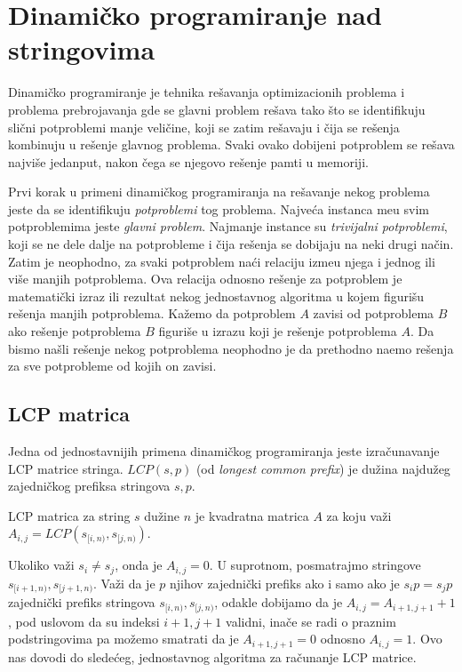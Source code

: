\section{Dinami\v cko programiranje nad stringovima}

Dinami\v cko programiranje je tehnika re\v savanja optimizacionih problema i problema prebrojavanja gde se glavni problem re\v sava tako \v sto se identifikuju sli\v cni potproblemi manje veli\v cine, koji se zatim re\v savaju i \v cija se re\v senja kombinuju u re\v senje glavnog problema. Svaki ovako dobijeni potproblem se re\v sava najvi\v se jedanput, nakon \v cega se njegovo re\v senje pamti u memoriji.

Prvi korak u primeni dinami\v ckog programiranja na re\v savanje nekog problema jeste da se identifikuju \textit{potproblemi} tog problema. Najve\' ca instanca me\dj u svim potproblemima jeste \textit{glavni problem}. Najmanje instance su \textit{trivijalni potproblemi}, koji se ne dele dalje na potprobleme i \v cija re\v senja se dobijaju na neki drugi na\v cin. Zatim je neophodno, za svaki potproblem na\' ci relaciju izme\dj u njega i jednog ili vi\v se manjih potproblema. Ova relacija odnosno re\v senje za potproblem je matemati\v cki izraz ili rezultat nekog jednostavnog algoritma u kojem figuri\v su re\v senja manjih potproblema. Ka\v zemo da potproblem $A$ zavisi od potproblema $B$ ako re\v senje potproblema $B$ figuri\v se u izrazu koji je re\v senje potproblema $A$. Da bismo na\v sli re\v senje nekog potproblema neophodno je da prethodno na\dj emo re\v senja za sve potprobleme od kojih on zavisi.

\subsection{LCP matrica}

Jedna od jednostavnijih primena dinami\v ckog programiranja jeste izra\v cunavanje LCP matrice stringa. $LCP(s, p)$ (od \textit{longest common prefix}) je du\v zina najdu\v zeg zajedni\v ckog prefiksa stringova $s,p$.

\begin{dfn}
LCP matrica za string $s$ du\v zine $n$ je kvadratna matrica $A$ za koju va\v zi $A_{i,j} = LCP(s_{[i,n)}, s_{[j, n)})$.
\end{dfn}

Ukoliko va\v zi $s_i \not = s_j$, onda je $A_{i,j} = 0$. U suprotnom, posmatrajmo stringove $s_{[i+1,n)}, s_{[j+1,n)}$. Va\v zi da je $p$ njihov zajedni\v cki prefiks ako i samo ako je $s_ip = s_jp$ zajedni\v cki prefiks stringova $s_{[i,n)}, s_{[j,n)}$, odakle dobijamo da je $A_{i,j} = A_{i+1,j+1}+1$, pod uslovom da su indeksi $i+1,j+1$ validni, ina\v ce se radi o praznim podstringovima pa mo\v zemo smatrati da je $A_{i+1,j+1} = 0$ odnosno $A_{i,j} = 1$. Ovo nas dovodi do slede\' ceg, jednostavnog algoritma za ra\v cunanje LCP matrice.

